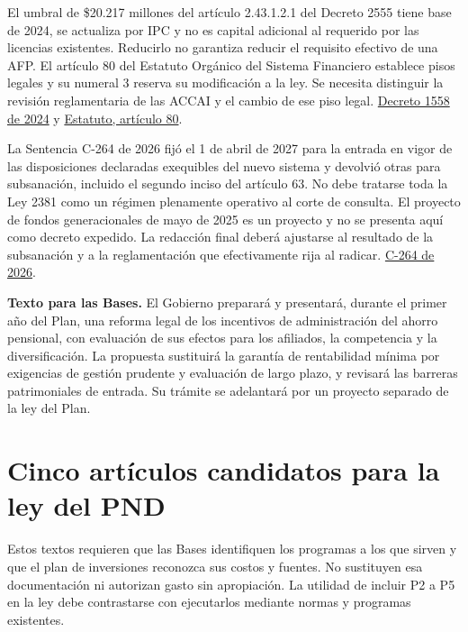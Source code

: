 El umbral de \$20.217 millones del artículo 2.43.1.2.1 del Decreto 2555 tiene base de 2024, se actualiza por IPC y no es capital adicional al requerido por las licencias existentes. Reducirlo no garantiza reducir el requisito efectivo de una AFP. El artículo 80 del Estatuto Orgánico del Sistema Financiero establece pisos legales y su numeral 3 reserva su modificación a la ley. Se necesita distinguir la revisión reglamentaria de las ACCAI y el cambio de ese piso legal. \href{https://normativa.colpensiones.gov.co/colpensiones/compilacion/docs/decreto\_1558\_2024.htm}{Decreto 1558 de 2024} y \href{https://normativa.colpensiones.gov.co/compilacion/docs/estatuto\_organico\_sistema\_financiero.htm}{Estatuto, artículo 80}.

La Sentencia C-264 de 2026 fijó el 1 de abril de 2027 para la entrada en vigor de las disposiciones declaradas exequibles del nuevo sistema y devolvió otras para subsanación, incluido el segundo inciso del artículo 63. No debe tratarse toda la Ley 2381 como un régimen plenamente operativo al corte de consulta. El proyecto de fondos generacionales de mayo de 2025 es un proyecto y no se presenta aquí como decreto expedido. La redacción final deberá ajustarse al resultado de la subsanación y a la reglamentación que efectivamente rija al radicar. \href{https://normativa.colpensiones.gov.co/compilacion/docs/c-264\_2026.htm}{C-264 de 2026}.

\textbf{Texto para las Bases.} El Gobierno preparará y presentará, durante el primer año del Plan, una reforma legal de los incentivos de administración del ahorro pensional, con evaluación de sus efectos para los afiliados, la competencia y la diversificación. La propuesta sustituirá la garantía de rentabilidad mínima por exigencias de gestión prudente y evaluación de largo plazo, y revisará las barreras patrimoniales de entrada. Su trámite se adelantará por un proyecto separado de la ley del Plan.

\section*{Cinco artículos candidatos para la ley del PND}

Estos textos requieren que las Bases identifiquen los programas a los que sirven y que el plan de inversiones reconozca sus costos y fuentes. No sustituyen esa documentación ni autorizan gasto sin apropiación. La utilidad de incluir P2 a P5 en la ley debe contrastarse con ejecutarlos mediante normas y programas existentes.


